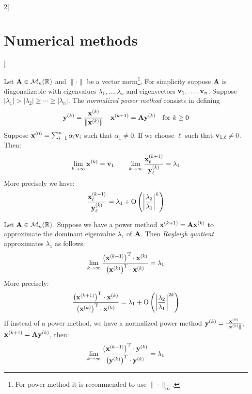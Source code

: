\documentclass[../../../main_math.tex]{subfiles}
\begin{document}
\begin{multicols}{2}[\section{Numerical methods}]
\begin{method}
  \end{method}
  \begin{method}
    Let $\boldsymbol{\mathrm{A}}\in\mathcal{M}_n(\mathbb{R})$ and $\|\cdot\|$ be a vector norm\footnote{For power method it is recommended to use $\|\cdot\|_\infty$.}. For simplicity suppose $\boldsymbol{\mathrm{A}}$ is diagonalizable with eigenvalues $\lambda_1,\ldots,\lambda_n$ and eigenvectors $\boldsymbol{\mathrm{v}}_1,\ldots,\boldsymbol{\mathrm{v}}_n$. Suppose $|\lambda_1|>|\lambda_2|\geq\cdots\geq|\lambda_n|$. The \emph{normalized power method} consists in defining $$\boldsymbol{\mathrm{y}}^{(k)}=\frac{\boldsymbol{\mathrm{x}}^{(k)}}{\|\boldsymbol{\mathrm{x}}^{(k)}\|}\quad\boldsymbol{\mathrm{x}}^{(k+1)}=\boldsymbol{\mathrm{A}}\boldsymbol{\mathrm{y}}^{(k)}\quad\text{for }k\geq 0$$ Suppose $\boldsymbol{\mathrm{x}}^{(0)}=\sum_{i=1}^n\alpha_i\boldsymbol{\mathrm{v}}_i$ such that $\alpha_1\ne0$. If we choose $\ell$ such that $\boldsymbol{\mathrm{v}}_{1,\ell}\ne0$. Then: $$\lim_{k\to\infty}\boldsymbol{\mathrm{x}}^{(k)}=\boldsymbol{\mathrm{v}}_1\qquad\lim_{k\to\infty}\frac{\boldsymbol{\mathrm{x}}_\ell^{(k+1)}}{\boldsymbol{\mathrm{y}}_\ell^{(k)}}=\lambda_1$$ More precisely we have: $$\frac{\boldsymbol{\mathrm{x}}_\ell^{(k+1)}}{\boldsymbol{\mathrm{y}}_\ell^{(k)}}=\lambda_1+\mathrm{O}\left(\left|\frac{\lambda_2}{\lambda_1}\right|^k\right)$$
  \end{method}
  \begin{method}
    Let $\boldsymbol{\mathrm{A}}\in\mathcal{M}_n(\mathbb{R})$. Suppose we have a power method $\boldsymbol{\mathrm{x}}^{(k+1)}=\boldsymbol{\mathrm{A}}\boldsymbol{\mathrm{x}}^{(k)}$ to approximate the dominant eigenvalue $\lambda_1$ of $\boldsymbol{\mathrm{A}}$. Then \emph{Rayleigh quotient} approximates $\lambda_1$ as follows: $$\lim_{k\to\infty}\frac{\left(\boldsymbol{\mathrm{x}}^{(k+1)}\right)^\mathrm{T}\cdot \boldsymbol{\mathrm{x}}^{(k)}}{\left(\boldsymbol{\mathrm{x}}^{(k)}\right)^\mathrm{T}\cdot\boldsymbol{\mathrm{x}}^{(k)}}=\lambda_1$$
    More precisely: $$\frac{\left(\boldsymbol{\mathrm{x}}^{(k+1)}\right)^\mathrm{T}\cdot \boldsymbol{\mathrm{x}}^{(k)}}{\left(\boldsymbol{\mathrm{x}}^{(k)}\right)^\mathrm{T}\cdot\boldsymbol{\mathrm{x}}^{(k)}}=\lambda_1+\mathrm{O}\left(\left|\frac{\lambda_2}{\lambda_1}\right|^{2k}\right)$$ If instead of a power method, we have a normalized power method $\boldsymbol{\mathrm{y}}^{(k)}=\frac{\boldsymbol{\mathrm{x}}^{(k)}}{\|\boldsymbol{\mathrm{x}}^{(k)}\|}$, $\boldsymbol{\mathrm{x}}^{(k+1)}=\boldsymbol{\mathrm{A}}\boldsymbol{\mathrm{y}}^{(k)}$, then: $$\lim_{k\to\infty}\frac{\left(\boldsymbol{\mathrm{x}}^{(k+1)}\right)^\mathrm{T}\cdot \boldsymbol{\mathrm{y}}^{(k)}}{\left(\boldsymbol{\mathrm{y}}^{(k)}\right)^\mathrm{T}\cdot\boldsymbol{\mathrm{y}}^{(k)}}=\lambda_1$$
  \end{method}
  \begin{method}

\end{method}
\end{multicols}
\end{document}
